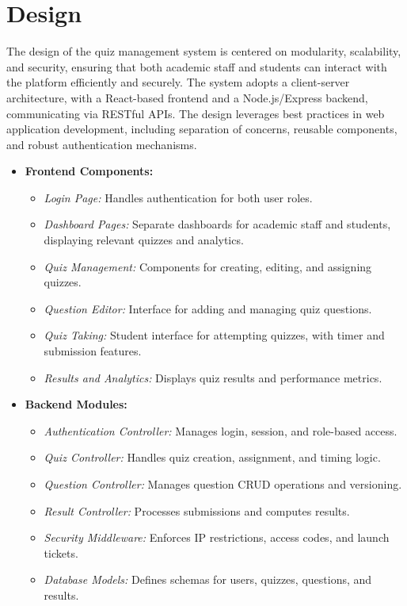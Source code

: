 \chapter{Design}

The design of the quiz management system is 
centered on modularity, scalability, and security, 
ensuring that both academic staff and students can 
interact with the platform efficiently and securely. 
The system adopts a client-server architecture, with a
 React-based frontend and a Node.js/Express backend, 
 communicating via RESTful APIs. 
 The design leverages best practices in web application development, including separation of concerns, reusable components, and robust authentication mechanisms.


\begin{itemize}
    \item \textbf{Frontend Components:}
    \begin{itemize}
        \item \textit{Login Page:} Handles authentication for both user roles.
        \item \textit{Dashboard Pages:} Separate dashboards for academic staff and students, displaying relevant quizzes and analytics.
        \item \textit{Quiz Management:} Components for creating, editing, and assigning quizzes.
        \item \textit{Question Editor:} Interface for adding and managing quiz questions.
        \item \textit{Quiz Taking:} Student interface for attempting quizzes, with timer and submission features.
        \item \textit{Results and Analytics:} Displays quiz results and performance metrics.
    \end{itemize}
    \item \textbf{Backend Modules:}
    \begin{itemize}
        \item \textit{Authentication Controller:} Manages login, session, and role-based access.
        \item \textit{Quiz Controller:} Handles quiz creation, assignment, and timing logic.
        \item \textit{Question Controller:} Manages question CRUD operations and versioning.
        \item \textit{Result Controller:} Processes submissions and computes results.
        \item \textit{Security Middleware:} Enforces IP restrictions, access codes, and launch tickets.
        \item \textit{Database Models:} Defines schemas for users, quizzes, questions, and results.
    \end{itemize}
\end{itemize}



